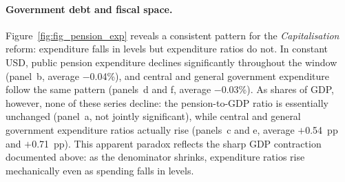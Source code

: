 \documentclass[11pt,english,a4paper, twoside, authoryear]{article}
\begin{document}
\paragraph{Government debt and fiscal space.} Figure~\ref{fig:fig_pension_exp} reveals a consistent pattern for the \textit{Capitalisation} reform: expenditure falls in levels but expenditure ratios do not. In constant USD, public pension expenditure declines significantly throughout the window (panel~b, average $-$0.04\%), and central and general government expenditure follow the same pattern (panels~d and f, average $-$0.03\%). As shares of GDP, however, none of these series decline: the pension-to-GDP ratio is essentially unchanged (panel~a, not jointly significant), while central and general government expenditure ratios actually rise (panels~c and e, average $+$0.54~pp and $+$0.71~pp). This apparent paradox reflects the sharp GDP contraction documented above: as the denominator shrinks, expenditure ratios rise mechanically even as spending falls in levels.
\end{document}
